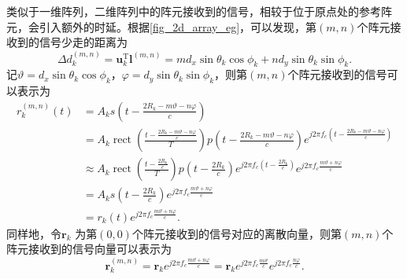 类似于一维阵列，二维阵列中的阵元接收到的信号，相较于位于原点处的参考阵元，会引入额外的时延。根据\cref{fig_2d_array_eg}，可以发现，第\( (m,n) \)个阵元接收到的信号少走的距离为
\[
    \Delta d^{(m,n)}_k = \bm{u}_k^{\mathrm{T}} \bm{l}^{(m,n)} = m d_x \sin\theta_k \cos\phi_k + n d_y \sin\theta_k \sin\phi_k.
\]
记\( \vartheta = d_x \sin\theta_k \cos\phi_k \)，\( \varphi = d_y \sin\theta_k \sin\phi_k \)，则第\( (m,n) \)个阵元接收到的信号可以表示为
\[
    \begin{split}
        r^{(m,n)}_k(t) & = A_k s\left(t - \frac{2 R_k - m \vartheta - n \varphi}{c}\right)                                                                                                                                                                    \\
                       & = A_k \operatorname{rect}\left(\frac{t - \frac{2 R_k - m \vartheta - n \varphi}{c}}{T}\right) p\left(t - \frac{2 R_k - m \vartheta - n \varphi}{c}\right) e^{j 2 \pi f_c \left(t - \frac{2 R_k - m \vartheta - n \varphi}{c}\right)} \\
                       & \approx A_k \operatorname{rect}\left(\frac{t - \frac{2 R_k}{c}}{T}\right) p\left(t - \frac{2 R_k}{c}\right) e^{j 2 \pi f_c \left(t - \frac{2 R_k}{c}\right)} e^{j 2 \pi f_c \frac{m \vartheta + n \varphi}{c}}                       \\
                       & = A_k s\left(t - \frac{2 R_k}{c}\right) e^{j 2 \pi f_c \frac{m \vartheta + n \varphi}{c}}                                                                                                                                            \\
                       & = r_k(t) e^{j 2 \pi f_c \frac{m \vartheta + n \varphi}{c}}.
    \end{split}
\]
同样地，令\( \bm{r}_k \) 为第\( (0,0) \)个阵元接收到的信号对应的离散向量，则第\( (m,n) \)个阵元接收到的信号向量可以表示为
\[
    \bm{r}_k^{(m,n)} = \bm{r}_k e^{j 2 \pi f_c \frac{m \vartheta + n \varphi}{c}} = \bm{r}_k e^{j 2 \pi f_c \frac{m \vartheta}{c}} e^{j 2 \pi f_c \frac{n \varphi}{c}}.
\]

